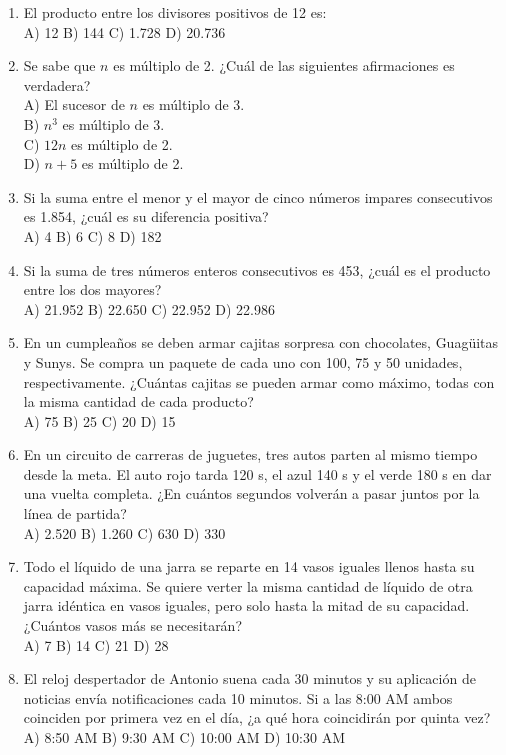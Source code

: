 \documentclass[11pt,letterpaper]{article}
\begin{document}
\begin{enumerate}[label=\textbf{\arabic*.}, leftmargin=*, itemsep=7pt]
\item El producto entre los divisores positivos de 12 es: \\ A) 12 \quad B) 144 \quad C) 1.728 \quad D) 20.736
\item Se sabe que $n$ es múltiplo de 2. ¿Cuál de las siguientes afirmaciones es verdadera?\\ A) El sucesor de $n$ es múltiplo de 3.\\ B) $n^3$ es múltiplo de 3.\\ C) $12n$ es múltiplo de 2.\\ D) $n+5$ es múltiplo de 2.
\item Si la suma entre el menor y el mayor de cinco números impares consecutivos es 1.854, ¿cuál es su diferencia positiva?\\ A) 4 \quad B) 6 \quad C) 8 \quad D) 182
\item Si la suma de tres números enteros consecutivos es 453, ¿cuál es el producto entre los dos mayores?\\ A) 21.952 \quad B) 22.650 \quad C) 22.952 \quad D) 22.986
\item En un cumpleaños se deben armar cajitas sorpresa con chocolates, Guagüitas y Sunys. Se compra un paquete de cada uno con 100, 75 y 50 unidades, respectivamente. ¿Cuántas cajitas se pueden armar como máximo, todas con la misma cantidad de cada producto?\\ A) 75 \quad B) 25 \quad C) 20 \quad D) 15
\item En un circuito de carreras de juguetes, tres autos parten al mismo tiempo desde la meta. El auto rojo tarda 120 s, el azul 140 s y el verde 180 s en dar una vuelta completa. ¿En cuántos segundos volverán a pasar juntos por la línea de partida?\\ A) 2.520 \quad B) 1.260 \quad C) 630 \quad D) 330
\item Todo el líquido de una jarra se reparte en 14 vasos iguales llenos hasta su capacidad máxima. Se quiere verter la misma cantidad de líquido de otra jarra idéntica en vasos iguales, pero solo hasta la mitad de su capacidad. ¿Cuántos vasos más se necesitarán?\\ A) 7 \quad B) 14 \quad C) 21 \quad D) 28
\item El reloj despertador de Antonio suena cada 30 minutos y su aplicación de noticias envía notificaciones cada 10 minutos. Si a las 8:00 AM ambos coinciden por primera vez en el día, ¿a qué hora coincidirán por quinta vez?\\ A) 8:50 AM \quad B) 9:30 AM \quad C) 10:00 AM \quad D) 10:30 AM

\end{enumerate}
\end{document}
